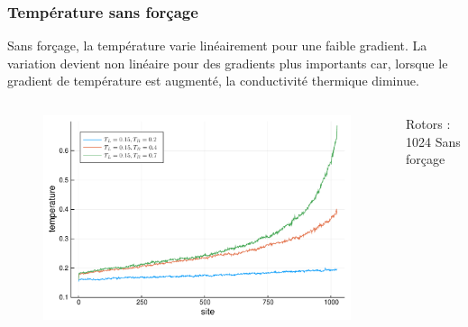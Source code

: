 \begin{frame}

    \frametitle{Température sans forçage}

    Sans forçage, la température varie linéairement pour une faible
    gradient. La variation devient non linéaire pour des gradients
    plus importants car, lorsque le gradient de température est augmenté,
    la conductivité thermique diminue.

    \setlength{\tabcolsep}{2pt}

    \begin{columns}

        \begin{column}{0.8\textwidth}
            \begin{figure}
                \includegraphics[scale=0.4]{plots/temperature_no_force.pdf}
            \end{figure}
        \end{column}

        \begin{column}{0.20\textwidth}
            \scriptsize
            Rotors : 1024
            Sans forçage
        \end{column}

    \end{columns}

\end{frame}

